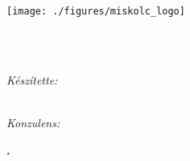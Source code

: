 \documentclass[11pt, a4paper, oneside]{Thesis} %
\begin{document}

\begin{titlepage}
\begin{flushleft}
\Large{
\univname\\
\instname\\
\deptname
}
\end{flushleft}
\begin{center}


\vspace{1cm}

\texttt{[image: ./figures/miskolc\_logo]}

\vspace{1cm}

{\huge \bfseries \ttitle}\\[0.4cm] %

\textsc{\Large \degreename}\\[0.5cm] %
 
 \vspace{4cm}

\textit{Készítette:}\\
\authornames\\
\textsc{\authorId}
 
\vspace{2cm}

\textit{Konzulens:}\\
\supname

\vspace{2cm}

\textbf{\the\year.}
 
\vfill
\end{center}

\end{titlepage}

\clearpage %

\tableofcontents
\newpage











\appendix

%
\end{document}
